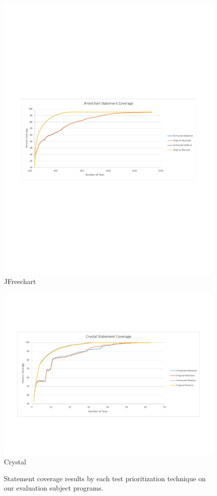 \begin{figure}[t]
\begin{minipage}[b]{\linewidth}
\includegraphics[scale=0.46]{jfreechart-coverage-figure}
JFreechart
\end{minipage}
\begin{minipage}[b]{\linewidth}
\centering
\includegraphics[scale=0.35]{crystal-coverage-figure}
{Crystal}
\end{minipage}
\vspace{-6mm}
\caption{
    \label{fig:priocoverage}
Statement coverage results by each test prioritization technique on
our evaluation subject programs.  }
\end{figure}





